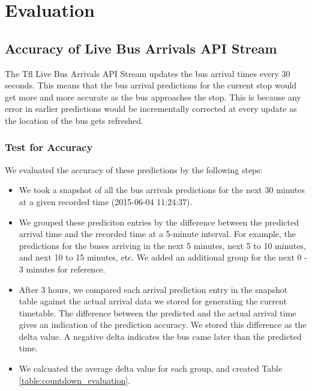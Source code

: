 \chapter{Evaluation}
\label{ch:evaluation}
\section{Accuracy of Live Bus Arrivals API Stream}
\par The Tfl Live Bus Arrivals API Stream updates the bus arrival times every 30 seconds. This means that the bus arrival predictions for the current stop would get more and more accurate as the bus approaches the stop. This is because any error in earlier predictions would be incrementally corrected at every update as the location of the bus gets refreshed.

\subsection{Test for Accuracy}
\par We evaluated the accuracy of these predictions by the following steps:

\begin{itemize}
  \item We took a snapshot of all the bus arrivals predictions for the next 30 minutes at a given recorded time (2015-06-04 11:24:37).
  \item We grouped these prediciton entries by the difference between the predicted arrival time and the recorded time at a 5-minute interval. For example, the predictions for the buses arriving in the next 5 minutes, next 5 to 10 minutes, and next 10 to 15 minutes, etc. We added an additional group for the next 0 - 3 minutes for reference.
  \item After 3 hours, we compared each arrival prediction entry in the snapshot table against the actual arrival data we stored for generating the current timetable. The difference between the predicted and the actual arrival time gives an indication of the prediction accuracy. We stored this difference as the delta value. A negative delta indicates the bus came later than the predicted time.
  \item We calcuated the average delta value for each group, and created Table \ref{table:countdown_evaluation}.
\end{itemize}

